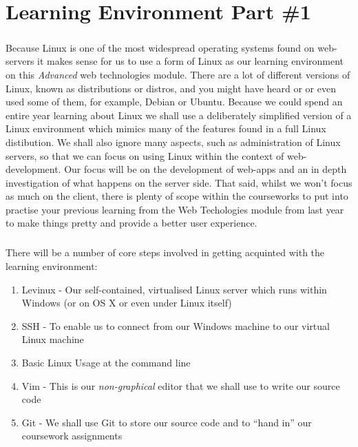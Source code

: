 \documentclass[12pt, a4paper, twoside]{book}
\begin{document}
\chapter{Learning Environment Part \#1}
\label{lab1}
\paragraph{} Because Linux is one of the most widespread operating systems found on web-servers it makes sense for us to use a form of Linux as our learning environment on this \emph{Advanced} web technologies module. There are a lot of different versions of Linux, known as distributions or distros, and you might have heard or or even used some of them, for example, Debian or Ubuntu. Because we could spend an entire year learning about Linux we shall use a deliberately simplified version of a Linux environment which mimics many of the features found in a full Linux distibution. We shall also ignore many aspects, such as administration of Linux servers, so that we can focus on using Linux within the context of web-development. Our focus will be on the development of web-apps and an in depth investigation of what happens on the server side. That said, whilst we won't focus as much on the client, there is plenty of scope within the courseworks to put into practise your previous learning from the Web Techologies module from last year to make things pretty and provide a better user experience.

\paragraph{} There will be a number of core steps involved in getting acquinted with the learning environment:

\begin{enumerate}
\item Levinux - Our self-contained, virtualised Linux server which runs within Windows (or on OS X or even under Linux itself)
\item SSH - To enable us to connect from our Windows machine to our virtual Linux machine
\item Basic Linux Usage at the command line
\item Vim - This is our \emph{non-graphical} editor that we shall use to write our source code
\item Git - We shall use Git to store our source code and to ``hand in'' our coursework assignments
\end{enumerate}
\end{document}
